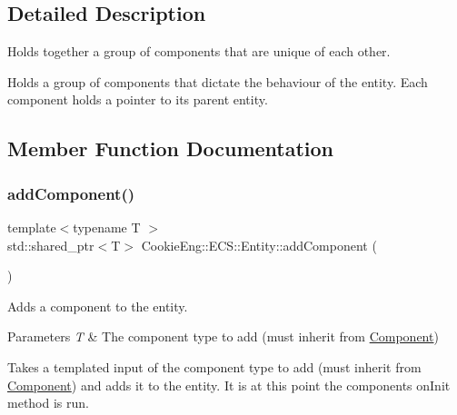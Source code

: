\subsection{Detailed Description}
Holds together a group of components that are unique of each other. 

Holds a group of components that dictate the behaviour of the entity. Each component holds a pointer to its parent entity. 

\subsection{Member Function Documentation}
\mbox{\label{class_cookie_eng_1_1_e_c_s_1_1_entity_a7b24f6959d8f1686e02e8ae5ef61f08c}} 
\subsubsection{\texorpdfstring{add\+Component()}{addComponent()}}
{\footnotesize\ttfamily template$<$typename T $>$ \\
std\+::shared\+\_\+ptr$<$T$>$ Cookie\+Eng\+::\+E\+C\+S\+::\+Entity\+::add\+Component (\begin{DoxyParamCaption}{ }\end{DoxyParamCaption})\hspace{0.3cm}{\ttfamily [inline]}}



Adds a component to the entity. 


\begin{DoxyParams}{Parameters}
{\em T} & The component type to add (must inherit from \hyperlink{class_cookie_eng_1_1_e_c_s_1_1_component}{Component})\\
\hline
\end{DoxyParams}
Takes a templated input of the component type to add (must inherit from \hyperlink{class_cookie_eng_1_1_e_c_s_1_1_component}{Component}) and adds it to the entity. It is at this point the components on\+Init method is run. \mbox{\label{class_cookie_eng_1_1_e_c_s_1_1_entity_a7e954d74445ccffe29412c885d97bf63}} 
